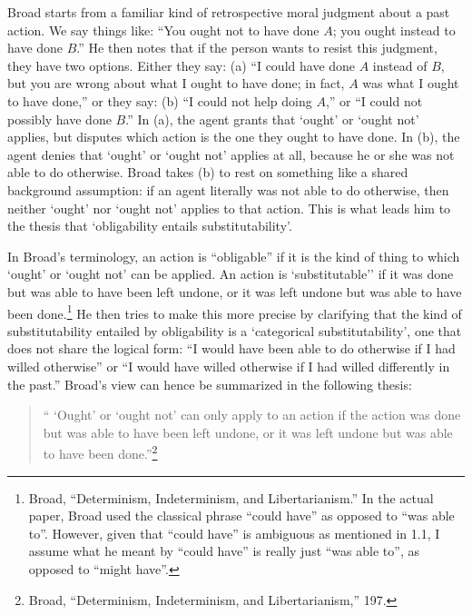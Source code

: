 Broad starts from a familiar kind of retrospective moral judgment about
a past action. We say things like: ``You ought not to have done $A$; you
ought instead to have done $B$.'' He then notes that if the person wants
to resist this judgment, they have two options. Either they say: (a) ``I
could have done $A$ instead of $B$, but you are wrong about what I ought to
have done; in fact, $A$ was what I ought to have done,'' or they say: (b)
``I could not help doing $A$,'' or ``I could not possibly have done $B$.''
In (a), the agent grants that `ought' or `ought not' applies, but
disputes which action is the one they ought to have done. In (b), the
agent denies that `ought' or `ought not' applies at all, because he or
she was not able to do otherwise. Broad takes (b) to rest on something
like a shared background assumption: if an agent literally was not able
to do otherwise, then neither `ought' nor `ought not' applies to that
action. This is what leads him to the thesis that `obligability entails
substitutability'.

In Broad's terminology, an action is ``obligable'' if it is the kind of
thing to which `ought' or `ought not' can be applied. An action is
`substitutable'' if it was done but was able to have been left undone,
or it was left undone but was able to have been done.\footnote{Broad,
  ``Determinism, Indeterminism, and Libertarianism.'' In the actual
  paper, Broad used the classical phrase ``could have'' as opposed to
  ``was able to''. However, given that ``could have'' is ambiguous as
  mentioned in 1.1, I assume what he meant by ``could have'' is really
  just ``was able to'', as opposed to ``might have''.} He then tries to
make this more precise by clarifying that the kind of substitutability
entailed by obligability is a `categorical substitutability', one that
does not share the logical form: ``I would have been able to do
otherwise if I had willed otherwise'' or ``I would have willed otherwise
if I had willed differently in the past.'' Broad's view can hence be
summarized in the following thesis:

\vspace{-1em}
\begin{quote}
`` `Ought' or `ought not' can only apply to an action if the action was
done but was able to have been left undone, or it was left undone but
was able to have been done.''\footnote{Broad, ``Determinism,
  Indeterminism, and Libertarianism,'' 197.}
\end{quote}

